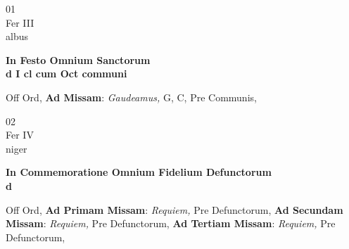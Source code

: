 \documentclass[10pt, openany]{book}
\begin{document}
        \begin{center}
            \begin{minipage}{3.5in}
                \vspace{2em}
                \begin{minipage}{0.5in}
                    {\Huge 01} \\
                    {\normalsize Fer III} \\
                    {\normalsize albus}
                \end{minipage}
                \begin{minipage}{3.0in}
                    \textbf{ \large In Festo Omnium Sanctorum \\
                    \textnormal{\normalsize d I cl cum Oct communi}} \\ 
                \end{minipage}
                \begin{justify}Off Ord, \textbf{Ad Missam}: \textit{Gaudeamus,} G, C, Pre Communis,  
                \end{justify}
            \end{minipage}
        \end{center}
    
        \begin{center}
            \begin{minipage}{3.5in}
                \vspace{2em}
                \begin{minipage}{0.5in}
                    {\Huge 02} \\
                    {\normalsize Fer IV} \\
                    {\normalsize niger}
                \end{minipage}
                \begin{minipage}{3.0in}
                    \textbf{ \large In Commemoratione Omnium Fidelium Defunctorum \\
                    \textnormal{\normalsize d}} \\ 
                \end{minipage}
                \begin{justify}Off Ord, \textbf{Ad Primam Missam}: \textit{Requiem,} Pre Defunctorum,  \textbf{Ad Secundam Missam}: \textit{Requiem,} Pre Defunctorum,  \textbf{Ad Tertiam Missam}: \textit{Requiem,} Pre Defunctorum,  
                \end{justify}
            \end{minipage}
        \end{center}
    
\end{document}
